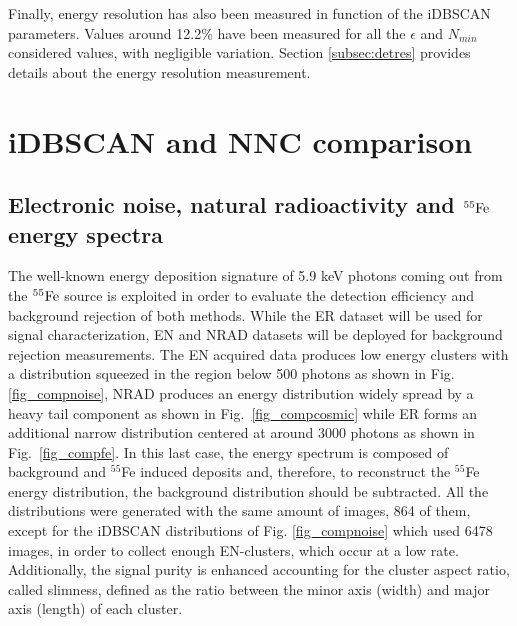 \documentclass[a4paper,11pt]{article}
\begin{document}
Finally, energy resolution has also been measured in function of the iDBSCAN parameters.
Values around 12.2\% have been measured for all the $\epsilon$ and $N_{min}$ considered values, with negligible variation. Section \ref{subsec:detres} provides details about the energy resolution measurement. 

\section{iDBSCAN and NNC comparison}
\label{sec:algoComp}


\subsection{Electronic noise, natural radioactivity and $\rm ^{55}Fe$ energy spectra}

The well-known energy deposition signature of 5.9 keV photons coming out from the $\rm ^{55}Fe$ source is exploited in order to evaluate the detection efficiency and background rejection of both methods. While the ER dataset will be used for signal characterization, EN and NRAD datasets will be deployed for background rejection measurements.
The EN acquired data produces low energy clusters with a distribution squeezed in the region below 500 photons as shown in Fig. \ref{fig_compnoise}, NRAD produces an energy distribution widely spread by a heavy tail component as shown in Fig.~\ref{fig_compcosmic} while ER forms an additional narrow distribution centered at around 3000 photons as shown in Fig.~\ref{fig_compfe}.
In this last case, the energy spectrum is composed of background and $^{55}$Fe induced deposits and, therefore, to reconstruct the $^{55}$Fe energy distribution, the background distribution should be subtracted. All the distributions were generated with the same amount of images, 864 of them, except for the iDBSCAN distributions of Fig. \ref{fig_compnoise} which used 6478 images, in order to collect enough EN-clusters, which occur at a low rate.  
Additionally, the signal purity is enhanced accounting for the cluster aspect ratio, called slimness, defined as the ratio between the minor axis (width) and major axis (length) of each cluster.
\end{document}
